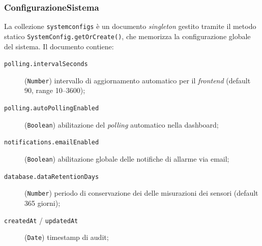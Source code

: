     \subsubsection{ConfigurazioneSistema}
        La collezione \texttt{systemconfigs} è un documento \emph{singleton}
        gestito tramite il metodo statico \texttt{SystemConfig.getOrCreate()}, che memorizza la configurazione globale del sistema. Il documento contiene:
        \begin{description}
            \item[\texttt{polling.intervalSeconds}] (\texttt{Number}) intervallo di aggiornamento automatico per il \textit{frontend} (default 90, range 10--3600);
            \item[\texttt{polling.autoPollingEnabled}] (\texttt{Boolean}) abilitazione del \textit{polling} automatico nella dashboard;
            \item[\texttt{notifications.emailEnabled}] (\texttt{Boolean}) abilitazione globale delle notifiche di allarme via email;
            \item[\texttt{database.dataRetentionDays}] (\texttt{Number}) periodo di conservazione dei delle misurazioni dei sensori (default 365 giorni);
            \item[\texttt{createdAt} / \texttt{updatedAt}] (\texttt{Date}) timestamp di audit;
        \end{description}

